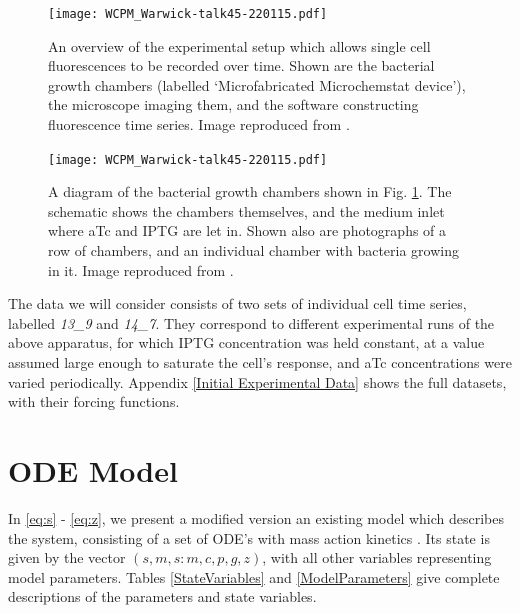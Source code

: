 \documentclass[10pt,journal]{./IEEE_latex_class/IEEEtran}
\begin{document}
\begin{figure}
    \centering
		\texttt{[image: WCPM\_Warwick-talk45-220115.pdf]}
        \caption{An overview of the experimental setup which allows single cell fluorescences to be recorded over time. Shown are the bacterial growth chambers (labelled `Microfabricated Microchemstat device'), the microscope imaging them, and the software constructing fluorescence time series. Image reproduced from \cite{Jaramillo}. }
            \label{ExperimentalSetup_overview}
\end{figure}
\begin{figure}
    \centering
	\texttt{[image: WCPM\_Warwick-talk45-220115.pdf]}
        \caption{A diagram of the bacterial growth chambers shown in Fig. \ref{ExperimentalSetup_overview}. The schematic shows the chambers themselves, and the medium inlet where aTc and IPTG are let in. Shown also are photographs of a row of chambers, and an individual chamber with bacteria growing in it. Image reproduced from \cite{Jaramillo}.}
    \label{ExperimentalSetup_chambers}
\end{figure}

The data we will consider consists of two sets of individual cell time series, labelled \textit{13\_9} and \textit{14\_7}. They correspond to different experimental runs of the above apparatus, for which IPTG concentration was held constant, at a value assumed large enough to saturate the cell's response, and aTc concentrations were varied periodically. Appendix \ref{Initial  Experimental Data} shows the full datasets, with their forcing functions.




\section{ODE Model}
\label{ODEModel}

In \eqref{eq:s} - \eqref{eq:z}, we present a modified version an existing model which describes the system, consisting of a set of ODE's with mass action kinetics \cite{UriAlon}.  Its state is given by the vector $(s,m,s:m,c,p,g,z)$, with all other variables representing model parameters. Tables \ref{StateVariables} and \ref{ModelParameters} give complete descriptions of the parameters and state variables.
 
\end{document}
